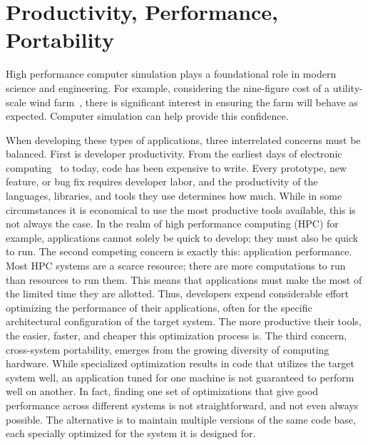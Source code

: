\chapter{Productivity, Performance, Portability}

High performance computer simulation plays a foundational role in modern science and engineering.
For example, considering the nine-figure cost of a utility-scale wind farm~\cite{wiser2022land}, there is significant interest in ensuring the farm will behave as expected. 
Computer simulation can help provide this confidence.

When developing these types of applications, three interrelated concerns must be balanced. 
First is developer productivity.
From the earliest days of electronic computing~\cite{backus1957fortran} to today, code has been expensive to write.
Every prototype, new feature, or bug fix requires developer labor, and the productivity of the languages, libraries, and tools they use determines how much.
While in some circumstances it is economical to use the most productive tools available, this is not always the case.
In the realm of high performance computing (HPC) for example, applications cannot solely be quick to develop; they must also be quick to run.
The second competing concern is exactly this: application performance.
Most HPC systems are a scarce resource; there are more computations to run than resources to run them.
This means that applications must make the most of the limited time they are allotted.
Thus, developers expend considerable effort optimizing the performance of their applications, often for the specific architectural configuration of the target system.
The more productive their tools, the easier, faster, and cheaper this optimization process is.
The third concern, cross-system portability, emerges from the growing diversity of computing hardware.
While specialized optimization results in code that utilizes the target system well, an application tuned for one machine is not guaranteed to perform well on another.
In fact, finding one set of optimizations that give good performance across different systems is not straightforward, and not even always possible.
The alternative is to maintain multiple versions of the same code base, each specially optimized for the system it is designed for.

